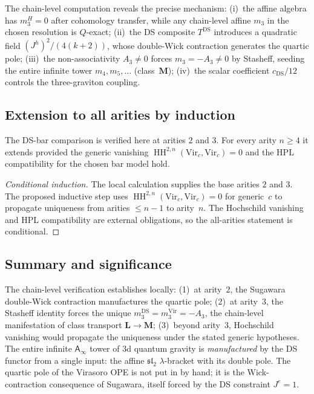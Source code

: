 \documentclass[11pt]{article}
\newcommand{\fsl}{\mathfrak{sl}}
\newcommand{\Ainf}{\mathsf{A}_{\infty}}
\newcommand{\HH}{\operatorname{HH}}
\begin{document}
\begin{observation}%
\label{obs:wn-sugawara-manufactures-m3}
The chain-level computation reveals the precise mechanism:
(i)~the affine algebra has $m_3^H=0$ after cohomology transfer,
while any chain-level affine $m_3$ in the chosen resolution is
$Q$-exact;
(ii)~the DS composite $T^{\mathrm{DS}}$ introduces a quadratic field
$(J^h)^2/(4(k+2))$, whose double-Wick contraction generates the
quartic pole;
(iii)~the non-associativity $A_3 \ne 0$ forces $m_3 = -A_3 \ne 0$
by Stasheff, seeding the entire infinite tower
$m_4, m_5, \ldots$ (class~$\mathbf{M}$);
(iv)~the scalar coefficient $c_{\mathrm{DS}}/12$ controls the
three-graviton coupling.
\end{observation}

\subsection{Extension to all arities by induction}

\begin{proposition}%
\label{prop:wn-ds-bar-all-arities}
The DS-bar comparison is verified here at arities $2$ and $3$.
For every arity $n\ge4$ it extends provided the generic vanishing
$\HH^{2,n}(\mathrm{Vir}_c,\mathrm{Vir}_c)=0$ and the HPL
compatibility for the chosen bar model hold.
\end{proposition}

\begin{proof}[Conditional induction]
The local calculation supplies the base arities $2$ and $3$.
The proposed inductive step uses
$\HH^{2,n}(\mathrm{Vir}_c, \mathrm{Vir}_c) = 0$ for
generic~$c$ to propagate uniqueness from arities $\le n-1$
to arity~$n$.  The Hochschild vanishing and HPL compatibility are
external obligations, so the all-arities statement is conditional.
\end{proof}

\subsection{Summary and significance}

The chain-level verification establishes locally: (1)~at arity~$2$,
the Sugawara double-Wick contraction manufactures the quartic pole;
(2)~at arity~$3$, the Stasheff identity forces the unique
$m_3^{\mathrm{DS}} = m_3^{\mathrm{Vir}} = -A_3$, the chain-level
manifestation of class transport $\mathbf{L} \to \mathbf{M}$;
(3)~beyond arity~$3$, Hochschild vanishing would propagate the
uniqueness under the stated generic hypotheses.
The entire infinite $\Ainf$ tower of 3d quantum gravity is
\emph{manufactured} by the DS functor from a single input: the
affine $\fsl_2$ $\lambda$-bracket with its double pole.
The quartic pole of the Virasoro OPE is not put in by hand;
it is the Wick-contraction consequence of Sugawara, itself
forced by the DS constraint $J^e = 1$.
\end{document}
